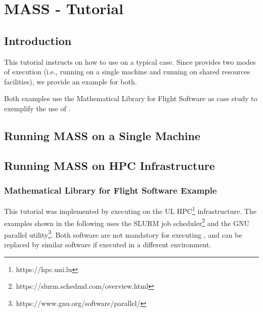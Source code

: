 
\chapter{MASS - Tutorial}

\section{Introduction}
\label{sec:mass:introduction}

This tutorial instructs on how to use \MASS on a typical case. Since \MASS provides two modes of execution (i.e., running \MASS on a single machine and running \MASS on shared resources facilities), we provide an example for both.

Both examples use the Mathematical Library for Flight Software as case study to exemplify the use of \FAQAS.


\section{Running MASS on a Single Machine}




%


\newpage
\section{Running MASS on HPC Infrastructure}

\subsection{Mathematical Library for Flight Software Example}

This tutorial was implemented by executing \MASS on the UL HPC\footnote{https://hpc.uni.lu} infrastructure.
The examples shown in the following uses the SLURM job scheduler\footnote{https://slurm.schedmd.com/overview.html} and the GNU parallel utility\footnote{https://www.gnu.org/software/parallel/}. Both software are not mandatory for executing \MASS, and can be replaced by similar software if executed in a different environment.

